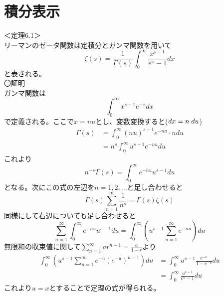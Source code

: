 \documentclass{jsarticle}
\begin{document}
\section{積分表示}
＜定理6.1＞\\
リーマンのゼータ関数は定積分とガンマ関数を用いて
\begin{equation}
\zeta(s)=\frac{1}{\Gamma(s)}\int_{0}^{\infty}\frac{x^{s-1}}{e^{x}-1}dx
\end{equation}
と表される。\\
〇証明\\
ガンマ関数は
\[\int_{0}^{\infty}x^{s-1}e^{-x}dx\]
で定義される。ここで\(x=nu\)とし、変数変換すると(\(dx=n\hspace{1mm}du\))
\begin{align*}
\Gamma(s)&=\int_{0}^{\infty}(nu)^{s-1}e^{-nu}\cdot n du\\
&=n^{s}\int_{0}^{\infty}u^{s-1}e^{-nu}du
\end{align*}
これより
\[n^{-s}\Gamma(s)=\int_{0}^{\infty}e^{-nu}u^{s-1}du\]
となる。次にこの式の左辺を\(n=1,2,...\)と足し合わせると
\[\Gamma(s)\sum_{n=1}^{\infty}\frac{1}{n^s}=\Gamma(s)\zeta(s)\]
同様にして右辺についても足し合わせると
\[\sum_{n=1}^{\infty}\int_{0}^{\infty}e^{-nu}u^{s-1}du=\int_{0}^{\infty}\left(u^{s-1}\sum_{n=1}^{\infty}e^{-nu}\right)du\]
無限和の収束値に関して\(\displaystyle\sum_{n=1}^{\infty}ar^{n-1}=\frac{a}{1-r}\)より
\begin{align*}
\int_{0}^{\infty}\left(u^{s-1}\sum_{n=1}^{\infty}e^{-u}\left(e^{-u}\right)^{n-1}\right)du&=\int_{0}^{\infty}u^{s-1}\frac{e^{-u}}{1-e^{-u}}du\\
&=\int_{0}^{\infty}\frac{u^{s-1}}{e^{u}-1}du
\end{align*}
これより\(u=x\)とすることで定理の式が得られる。








\setcounter{equation}{0}
\end{document}
